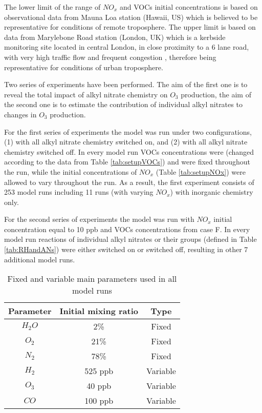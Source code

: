 \documentclass[11pt,a4paper]{article}
\begin{document}
The lower limit of the range of $NO_x$ and VOCs initial concentrations is based on observational data from Mauna Loa station (Hawaii, US) which is believed to be representative for conditions of remote troposphere. The upper limit is based on data from 
Marylebone Road station (London, UK) which is a kerbside monitoring site located in central London, in close proximity to a 6 lane road, with very high traffic flow and frequent congestion \citep{VonSchneidemesser2010}, therefore being representative for conditions of urban troposphere.

Two series of experiments have been performed. The aim of the first one is to reveal the total impact of alkyl nitrate chemistry on $O_3$ production, the aim of the second one is to estimate the contribution of individual alkyl nitrates to changes in $O_3$ production.

For the first series of experiments the model was run under two configurations, (1) with all alkyl nitrate chemistry switched on, and (2) with all alkyl nitrate chemistry switched off. In every model run VOCs concentrations were (changed according to the data from Table \ref{tab:setupVOCs}) and were fixed throughout the run, while the initial concentrations of $NO_x$ (Table \ref{tab:setupNOx}) were allowed to vary throughout the run. As a result, the first experiment consists of 253 model runs including 11 runs (with varying $NO_x$) with inorganic chemistry only.

For the second series of experiments the model was run with $NO_x$ initial concentration equal to 10 ppb and VOCs concentrations from case F. In every model run reactions of individual alkyl nitrates or their groups (defined in Table \ref{tab:RHandANs}) were either switched on or switched off, resulting in other 7 additional model runs.

\begin{table} %
\caption{Fixed and variable main parameters used in all model runs}\label{tab:setupO3CO}
\centering
\begin{tabular}{ccc}
\hline
Parameter & Initial mixing ratio & Type \\
\hline
$H_2O$    & 2\%                  & Fixed    \\
$O_2$     & 21\%                 & Fixed    \\
$N_2$     & 78\%                 & Fixed    \\
$H_2$     & 525 ppb              & Variable \\
$O_3$     & 40 ppb               & Variable \\
$CO$      & 100 ppb              & Variable \\
\hline
\end{tabular}
\end{table}
\end{document}
